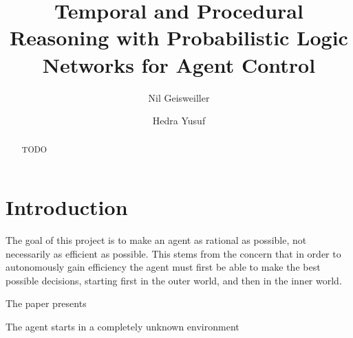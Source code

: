 \documentclass[runningheads]{llncs}
\begin{document}
%
\title{Temporal and Procedural Reasoning with Probabilistic Logic
  Networks for Agent Control}

%
\author{Nil Geisweiller
  \and Hedra Yusuf}
%
%
%
\maketitle              %
%

\begin{abstract}
  TODO

\end{abstract}

\section{Introduction}

The goal of this project is to make an agent as rational as possible,
not necessarily as efficient as possible.  This stems from the concern
that in order to autonomously gain efficiency the agent must first be
able to make the best possible decisions, starting first in the outer
world, and then in the inner world.


The paper presents

The agent starts in a completely unknown environment
\end{document}
